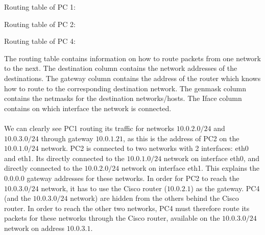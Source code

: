 Routing table of PC 1:

Routing table of PC 2:

Routing table of PC 4:


The routing table contains information on how to route packets from one network to the next. The destination column contains the network addresses of the destinations. The gateway column contains the address of the router which knows how to route to the corresponding destination network. The genmask column contains the netmasks for the destination networks/hosts. The Iface column contains on which interface the network is connected.\\\\
We can clearly see PC1 routing its traffic for networks $10.0.2.0 / 24$ and $10.0.3.0 / 24$ through gateway $10.0.1.21$, as this is the address of PC2 on the $10.0.1.0 / 24$ network. PC2 is connected to two networks with 2 interfaces: eth0 and eth1. Its directly connected to the $10.0.1.0 / 24$ network on interface eth0, and directly connected to the $10.0.2.0 / 24$ network on interface eth1. This explains the $0.0.0.0$ gateway addresses for these networks. In order for PC2 to reach the $10.0.3.0 / 24$ network, it has to use the Cisco router ($10.0.2.1$) as the gateway. PC4 (and the $10.0.3.0 / 24$ network) are hidden from the others behind the Cisco router. In order to reach the other two networks, PC4 must therefore route its packets for these networks through the Cisco router, available on the $10.0.3.0 / 24$ network on address $10.0.3.1$.
